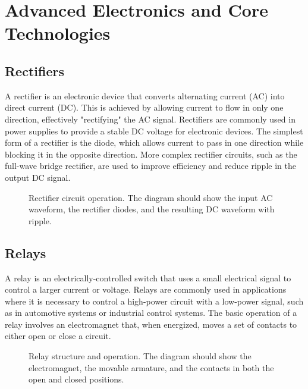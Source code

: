 \section{Advanced Electronics and Core Technologies}
\label{section:advanced_electronics}

\subsection*{Rectifiers}
A rectifier is an electronic device that converts alternating current (AC) into direct current (DC). This is achieved by allowing current to flow in only one direction, effectively "rectifying" the AC signal. Rectifiers are commonly used in power supplies to provide a stable DC voltage for electronic devices. The simplest form of a rectifier is the diode, which allows current to pass in one direction while blocking it in the opposite direction. More complex rectifier circuits, such as the full-wave bridge rectifier, are used to improve efficiency and reduce ripple in the output DC signal.

\begin{figure}[h!]
    \centering
    \caption{Rectifier circuit operation. The diagram should show the input AC waveform, the rectifier diodes, and the resulting DC waveform with ripple.}
    \label{fig:rectifier}
\end{figure}

\subsection*{Relays}
A relay is an electrically-controlled switch that uses a small electrical signal to control a larger current or voltage. Relays are commonly used in applications where it is necessary to control a high-power circuit with a low-power signal, such as in automotive systems or industrial control systems. The basic operation of a relay involves an electromagnet that, when energized, moves a set of contacts to either open or close a circuit.

\begin{figure}[h!]
    \centering
    \caption{Relay structure and operation. The diagram should show the electromagnet, the movable armature, and the contacts in both the open and closed positions.}
    \label{fig:relay}
\end{figure}

